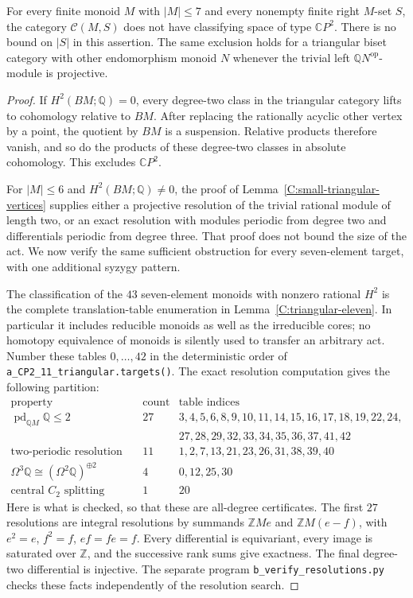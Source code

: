 \begin{proposition}
\label{C:seven-act-cones}
For every finite monoid $M$ with $|M|\leq7$ and every nonempty
finite right $M$-set $S$, the category $\mathcal C(M,S)$ does not
have classifying space of type $\mathbb CP^2$.
There is no bound on $|S|$ in this assertion. The same exclusion
holds for a triangular biset category with other endomorphism
monoid $N$ whenever the trivial left
$\mathbb QN^{\mathrm{op}}$-module is projective.
\end{proposition}
\begin{proof}
If $H^2(BM;\mathbb Q)=0$, every degree-two class in the
triangular category lifts to cohomology relative to $BM$.
After replacing the rationally acyclic other vertex by a point,
the quotient by $BM$ is a suspension. Relative products therefore
vanish, and so do the products of these degree-two classes in
absolute cohomology. This excludes $\mathbb CP^2$.

For $|M|\leq6$ and $H^2(BM;\mathbb Q)\ne0$, the proof of
Lemma~\ref{C:small-triangular-vertices} supplies either a projective
resolution of the trivial rational module of length two, or an
exact resolution with modules periodic from degree two and
differentials periodic from degree three. That proof does not
bound the size of the act. We now verify the same sufficient
obstruction for every seven-element target, with one additional
syzygy pattern.

The classification of the $43$ seven-element monoids with
nonzero rational $H^2$ is the complete translation-table
enumeration in Lemma~\ref{C:triangular-eleven}. In particular it
includes reducible monoids as well as the irreducible cores; no
homotopy equivalence of monoids is silently used to transfer an
arbitrary act. Number these tables $0,\ldots,42$ in the
deterministic order of \texttt{a\_CP2\_11\_triangular.targets()}.
The exact resolution computation gives the following partition:
\[
\begin{array}{c|r|l}
 \text{property}&\text{count}&\text{table indices}\\\hline
 \operatorname{pd}_{\mathbb QM}\mathbb Q\leq2&27&
 3,4,5,6,8,9,10,11,14,15,16,17,18,19,22,24,\\
 &&27,28,29,32,33,34,35,36,37,41,42\\
 \text{two-periodic resolution tail}&11&
 1,2,7,13,21,23,26,31,38,39,40\\
 \Omega^3\mathbb Q\cong(\Omega^2\mathbb Q)^{\oplus2}&4&0,12,25,30\\
 \text{central }C_2\text{ splitting}&1&20
\end{array}
\]
Here is what is checked, so that these are all-degree certificates.
The first $27$ resolutions are integral resolutions by summands
$\mathbb ZM e$ and $\mathbb ZM(e-f)$, with
$e^2=e$, $f^2=f$, $ef=fe=f$. Every differential is equivariant,
every image is saturated over $\mathbb Z$, and the successive
rank sums give exactness. The final degree-two differential is
injective. The separate program
\texttt{b\_verify\_resolutions.py} checks these facts independently
of the resolution search.


\end{proof}
